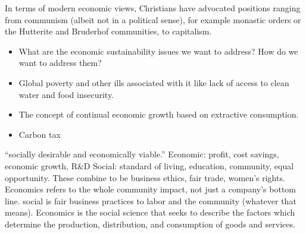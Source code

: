 \documentclass[12pt]{article}
\begin{document}
In terms of modern economic views, Christians have advocated positions ranging from
communism (albeit not in a political sense), for example monastic orders or the Hutterite
and Bruderhof communities, to capitalism.

\begin{itemize}
\item{What are the economic sustainability issues we want to address? How do we want to address them?}
\item{Global poverty and other ills associated with it like lack of access to clean water and food insecurity.}
\item{The concept of continual economic growth based on extractive consumption.}
\item{Carbon tax}
\end{itemize}
%
%
%


``socially desirable and economically viable.''
Economic: profit, cost savings, economic growth, R\&D
Social: standard of living, education, community, equal opportunity. These combine to be business ethics, fair trade, women's rights.
Economics refers to the whole community impact, not just a company's bottom line.
social is fair business practices to labor and the community (whatever that means).
Economics is the social science that seeks to describe the factors which determine the production, distribution, and consumption of goods and services.
\end{document}
